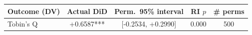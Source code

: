 \begin{tabular}{lcccc}
\toprule
Outcome (DV) & Actual DiD & Perm.\ 95\% interval & RI $p$ & \# perms \\
\midrule
Tobin's Q & +0.6587*** & [-0.2534, +0.2990] & 0.000 & 500 \\
\bottomrule
\end{tabular}